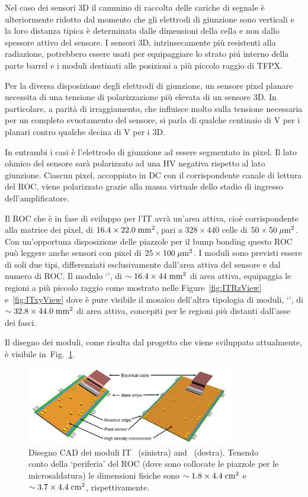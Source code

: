 Nel caso dei sensori 3D il cammino di raccolta delle cariche di segnale \`e ulteriormente ridotto dal momento che gli elettrodi di giunzione sono verticali e la loro distanza tipica \`e determinata dalle dimensioni della cella e non dallo spessore attivo del sensore. I sensori 3D, intrinsecamente pi\`u resistenti alla radiazione, potrebbero essere usati per equipaggiare lo strato pi\'u interno della parte barrel e i moduli destinati alle posizioni a pi\`u piccolo raggio di TFPX.

Per la diversa disposizione degli elettrodi di giunzione, un sensore pixel planare necessita di una tensione di polarizzazione pi\`u elevata di un sensore 3D. In particolare, a parit\`a di irraggiamento, che influisce molto sulla tensione necessaria per un completo svuotamento del sensore, si parla di qualche centinaio di V per i planari contro qualche decina di V per i 3D.

In entrambi i casi \`e l'elettrodo di giunzione ad essere segmentato in pixel. Il lato ohmico del sensore sar\`a polarizzato ad una HV negativa rispetto al lato giunzione. Ciascun pixel, accoppiato in DC con il corrispondente canale di lettura del ROC, viene polarizzato grazie alla massa virtuale dello stadio di ingresso dell'amplificatore.
%
%

Il ROC che \`e in fase di sviluppo per l'IT avr\`a un'area attiva, cio\`e corrispondente alla matrice dei pixel, di $16.4\times22.0\rm \; mm^2$, pari a $328\times440$ celle di $50\times50\; \mu \rm m^2$. Con un'opportuna disposizione delle piazzole per il bump bonding questo ROC pu\`o leggere anche sensori con pixel di $25\times100\; \mu \rm m^2$. 
I moduli sono previsti essere di soli due tipi, differenziati esclusivamente dall'area attiva del sensore e dal numero di ROC. Il modulo `{\modud}', di $\sim16.4\times44\rm \; mm^2$ di area attiva, equipaggia le regioni a pi\`u piccolo raggio come mostrato nelle Figure~\ref{fig:ITRzView} e~\ref{fig:ITxyView} dove \`e pure visibile il mosaico dell'altra tipologia di moduli, `{\moddd}', di $\sim32.8\times44.0\rm \; mm^2$ di area attiva, concepiti per le regioni pi\`u distanti dall'asse dei fasci.

Il disegno dei moduli, come risulta dal progetto che viene sviluppato attualmente, \`e visibile in~Fig.~\ref{fig:ITModSkecth}.
\begin{figure}
\centering
\includegraphics[width=0.8\textwidth]{Immagini/ITModSkecth.PNG}
\caption{Disegno CAD dei moduli IT \modud\ (sinistra) and \moddd\ (destra). Tenendo conto della `periferia' del ROC (dove sono collocate le piazzole per le microsaldatura) le dimensioni fisiche sono  $\sim1.8\times4.4\rm \; cm^2$ e  $\sim3.7\times4.4\rm \; cm^2$, rispettivamente.}  
\label{fig:ITModSkecth}
\end{figure}


